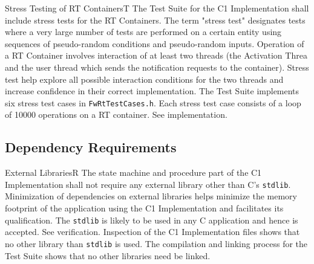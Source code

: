 \documentclass[a4paper,10pt]{article}
\newenvironment{fw_req}[6]
{\addtocounter{subsubsection}{1}
	\hspace{0.2cm}\textbf{FW-\arabic{section}.\arabic{subsection}.\arabic{subsubsection}/#2
	\hspace{0.8cm} #1}
	\vspace{-10pt}
\begin{longtable}{p{2.7cm}P{8.5cm}}
\hline
\textsc{Requirement} & #3 \\
\textsc{Justification} & #4 \\
\textsc{Implementation} & #5  \\ 
\textsc{Verification} & #6  \\
\hline
}
{\end{longtable}}
\newenvironment{fw_req_note}[7]
{\addtocounter{subsubsection}{1}
	\hspace{0.2cm}\textbf{FW-\arabic{section}.\arabic{subsection}.\arabic{subsubsection}/#2
	\hspace{0.8cm} #1}
	\vspace{-10pt}
\begin{longtable}{p{2.7cm}P{8.5cm}}
\hline
\textsc{Requirement} & #3 \\
\textsc{Note} & #4 \\
\textsc{Justification} & #5 \\
\textsc{Implementation} & #6  \\ 
\textsc{Verification} & #7  \\
\hline
}
{\end{longtable}}
\begin{document}
\begin{fw_req_note}{Stress Testing of RT Containers}{T}
{The Test Suite for the C1 Implementation shall include stress tests for the RT Containers.}
{The term "stress test" designates tests where a very large number of tests are performed on a certain entity using sequences of pseudo-random conditions and pseudo-random inputs.}
{Operation of a RT Container involves interaction of at least two threads (the Activation Threa and the user thread which sends the notification requests to the container). Stress test help explore all possible interaction conditions for the two threads and increase confidence in their correct implementation.}
{The Test Suite implements six stress test cases in \texttt{FwRtTestCases.h}. Each stress test case consists of a loop of 10000 operations on a RT container.} 
{See implementation.}
\end{fw_req_note}



\subsection{Dependency Requirements}\label{req:dependencyReqs}

\begin{fw_req}{External Libraries}{R}
{The state machine and procedure part of the C1 Implementation shall not require any external library other than C's \texttt{stdlib}.}
{Minimization of dependencies on external libraries 
helps minimize the memory footprint of the application using 
the C1 Implementation and facilitates its qualification. 
The \texttt{stdlib} is likely to be used in any C application and hence is accepted.}
{See verification.} 
{Inspection of the C1 Implementation files shows that no other library than \texttt{stdlib} is used. 
The compilation and linking process for the Test Suite shows that no other libraries need be linked.}
\end{fw_req}
\end{document}
